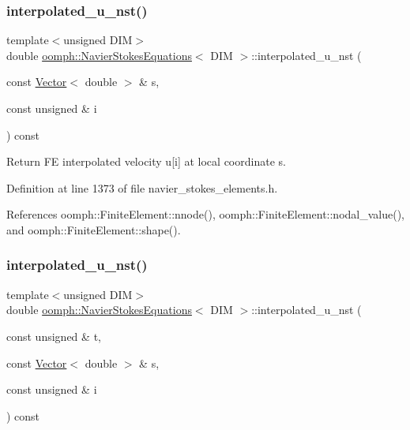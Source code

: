 \subsubsection{\texorpdfstring{interpolated\+\_\+u\+\_\+nst()}{interpolated\_u\_nst()}\hspace{0.1cm}{\footnotesize\ttfamily [2/3]}}
{\footnotesize\ttfamily template$<$unsigned D\+IM$>$ \\
double \hyperlink{classoomph_1_1NavierStokesEquations}{oomph\+::\+Navier\+Stokes\+Equations}$<$ D\+IM $>$\+::interpolated\+\_\+u\+\_\+nst (\begin{DoxyParamCaption}\item[{const \hyperlink{classoomph_1_1Vector}{Vector}$<$ double $>$ \&}]{s,  }\item[{const unsigned \&}]{i }\end{DoxyParamCaption}) const\hspace{0.3cm}{\ttfamily [inline]}}



Return FE interpolated velocity u\mbox{[}i\mbox{]} at local coordinate s. 



Definition at line 1373 of file navier\+\_\+stokes\+\_\+elements.\+h.



References oomph\+::\+Finite\+Element\+::nnode(), oomph\+::\+Finite\+Element\+::nodal\+\_\+value(), and oomph\+::\+Finite\+Element\+::shape().

\mbox{\label{classoomph_1_1NavierStokesEquations_a1102659657117d04827fbd7b8b1f6d94}} 
\subsubsection{\texorpdfstring{interpolated\+\_\+u\+\_\+nst()}{interpolated\_u\_nst()}\hspace{0.1cm}{\footnotesize\ttfamily [3/3]}}
{\footnotesize\ttfamily template$<$unsigned D\+IM$>$ \\
double \hyperlink{classoomph_1_1NavierStokesEquations}{oomph\+::\+Navier\+Stokes\+Equations}$<$ D\+IM $>$\+::interpolated\+\_\+u\+\_\+nst (\begin{DoxyParamCaption}\item[{const unsigned \&}]{t,  }\item[{const \hyperlink{classoomph_1_1Vector}{Vector}$<$ double $>$ \&}]{s,  }\item[{const unsigned \&}]{i }\end{DoxyParamCaption}) const\hspace{0.3cm}{\ttfamily [inline]}}



